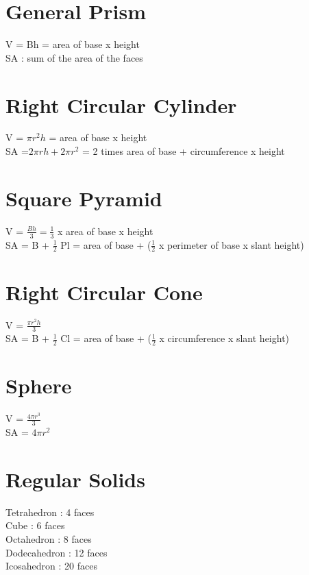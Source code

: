 \documentclass[10pt,onecolumn]{article}
\begin{document}
{%
\section{General Prism}
V = Bh = area of base x height \\
SA : sum of the area of the faces \\

\section{Right Circular Cylinder}
V = \(\pi r^2 h\) = area of base x height \\
SA =\(2 \pi rh + 2 \pi r^2\) = 2 times area of base + circumference x height \\

\section{Square Pyramid}
V = \(\frac{Bh}{3} = \frac{1}{3}\) x area of base x height \\
SA = B + \(\frac{1}{2}\) Pl = area of base + (\(\frac{1}{2}\) x perimeter of base x slant height) \\

\section{Right Circular Cone}
V = \(\frac{\pi r^2 h}{3}\) \\
SA = B + \(\frac{1}{2}\) Cl = area of base + (\(\frac{1}{2}\) x circumference x slant height) \\

\section{Sphere}
V = \(\frac{4\pi r^3}{3}\) \\
SA = \(4\pi r^2\) \\

\section{Regular Solids}
Tetrahedron : 4 faces \\
Cube : 6 faces \\
Octahedron : 8 faces \\
Dodecahedron : 12 faces \\
Icosahedron : 20 faces \\

}
\end{document}
